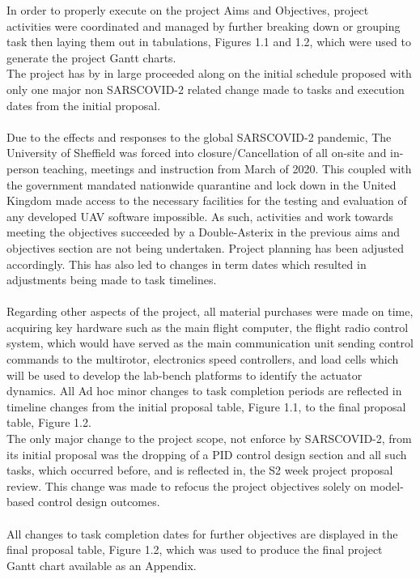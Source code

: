 \documentclass[12pt,a4paper,twoside]{report}
\begin{document}
			In order to properly execute on the project Aims and Objectives, project activities were coordinated and managed by further breaking down or grouping task then laying them out in tabulations, Figures 1.1 and 1.2, which were used to generate the project Gantt charts.
			\\
			The project has by in large proceeded along on the initial schedule proposed with only one major non SARSCOVID-2 related change made to tasks and execution dates from the initial proposal. 
			\\ \\
			Due to the effects and responses to the global SARSCOVID-2 pandemic, The University of Sheffield was forced into closure/Cancellation of all on-site and in-person teaching, meetings and instruction from March of 2020. This coupled with the government mandated nationwide quarantine and lock down in the United Kingdom made access to the necessary facilities for the testing and evaluation of any developed UAV software impossible. As such, activities and work towards meeting the objectives succeeded by a Double-Asterix in the previous aims and objectives section are not being undertaken. Project planning has been adjusted accordingly. This has also led to changes in term dates which resulted in adjustments being made to task timelines.
			\\ \\
			Regarding other aspects of the project, all material purchases were made on time, acquiring key hardware such as the main flight computer, the flight radio control system, which would have served as the main communication unit sending control commands to the multirotor, electronics speed controllers, and load cells which will be used to develop the lab-bench platforms to identify the actuator dynamics. All Ad hoc minor changes to task completion periods are reflected in timeline changes from the initial proposal table, Figure 1.1, to the final proposal table, Figure 1.2. 
			\\
			The only major change to the project scope, not enforce by SARSCOVID-2, from its initial proposal was the dropping of a PID control design section and all such tasks, which occurred before, and is reflected in, the S2 week project proposal review. This change was made to refocus the project objectives solely on model-based control design outcomes.
			\\ \\
			All changes to task completion dates for further objectives are displayed in the final proposal table, Figure 1.2, which was used to produce the final project Gantt chart available as an Appendix.
			
\end{document}
